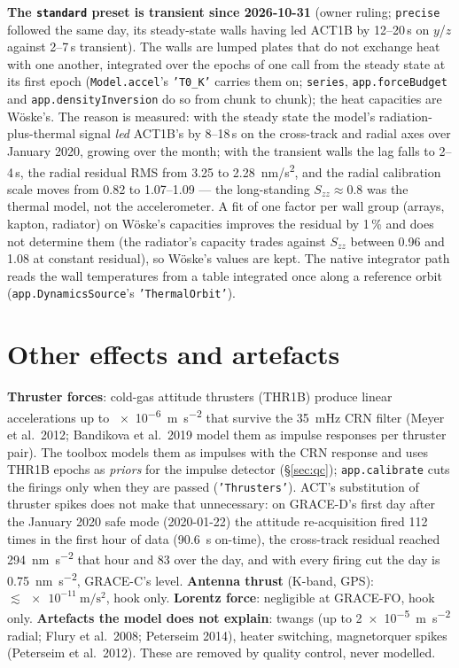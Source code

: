 \textbf{The \texttt{standard} preset is transient since 2026-10-31} (owner ruling; \texttt{precise} followed the same day, its steady-state walls having led ACT1B by 12--20\,s on $y$/$z$ against 2--7\,s transient). The walls are lumped plates that do not exchange heat with one another, integrated over the epochs of one call from the steady state at its first epoch (\texttt{Model.accel}'s \texttt{'T0\_K'} carries them on; \texttt{series}, \texttt{app.forceBudget} and \texttt{app.densityInversion} do so from chunk to chunk); the heat capacities are Wöske's. The reason is measured: with the steady state the model's radiation-plus-thermal signal \emph{led} ACT1B's by 8--18\,s on the cross-track and radial axes over January 2020, growing over the month; with the transient walls the lag falls to 2--4\,s, the radial residual RMS from \SI{3.25}{} to \SI{2.28}{nm/s^2}, and the radial calibration scale moves from 0.82 to 1.07--1.09 --- the long-standing $S_{zz}\approx0.8$ was the thermal model, not the accelerometer. A fit of one factor per wall group (arrays, kapton, radiator) on Wöske's capacities improves the residual by 1\,\% and does not determine them (the radiator's capacity trades against $S_{zz}$ between 0.96 and 1.08 at constant residual), so Wöske's values are kept. The native integrator path reads the wall temperatures from a table integrated once along a reference orbit (\texttt{app.DynamicsSource}'s \texttt{'ThermalOrbit'}).

\section{Other effects and artefacts}
\textbf{Thruster forces}: cold-gas attitude thrusters (THR1B) produce linear accelerations up to \SI{e-6}{\metre\per\second\squared} that survive the \SI{35}{mHz} CRN filter (Meyer et al.\ 2012; Bandikova et al.\ 2019 model them as impulse responses per thruster pair). The toolbox models them as impulses with the CRN response and uses THR1B epochs as \emph{priors} for the impulse detector (\S\ref{sec:qc}); \texttt{app.calibrate} cuts the firings only when they are passed (\texttt{'Thrusters'}). ACT's substitution of thruster spikes does not make that unnecessary: on GRACE-D's first day after the January 2020 safe mode (2020-01-22) the attitude re-acquisition fired 112 times in the first hour of data (\SI{90.6}{\second} on-time), the cross-track residual reached \SI{294}{\nano\metre\per\second\squared} that hour and \SI{83}{} over the day, and with every firing cut the day is \SI{0.75}{\nano\metre\per\second\squared}, GRACE-C's level. \textbf{Antenna thrust} (K-band, GPS): $\lesssim\SI{e-11}{\metre\per\second\squared}$, hook only. \textbf{Lorentz force}: negligible at GRACE-FO, hook only. \textbf{Artefacts the model does not explain}: twangs (up to \SI{2e-5}{\metre\per\second\squared} radial; Flury et al.\ 2008; Peterseim 2014), heater switching, magnetorquer spikes (Peterseim et al.\ 2012). These are removed by quality control, never modelled.

